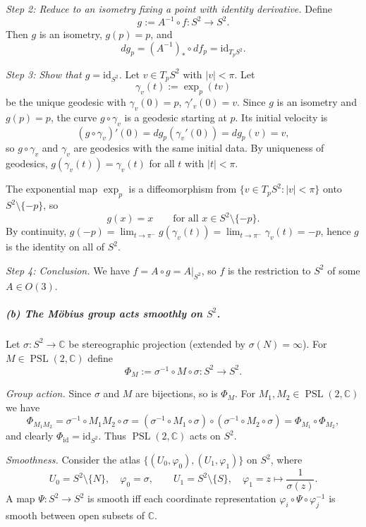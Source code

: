 \documentclass[12pt,a4paper]{article}
\theoremstyle{plain}
\theoremstyle{definition}      %
\begin{document}
	\emph{Step 2: Reduce to an isometry fixing a point with identity derivative.}
	Define
	\[
	g := A^{-1}\circ f:S^{2}\to S^{2}.
	\]
	Then $g$ is an isometry, $g(p)=p$, and
	\[
	dg_p=(A^{-1})_{*}\circ df_p=\mathrm{id}_{T_pS^{2}}.
	\]
	
	\emph{Step 3: Show that $g=\mathrm{id}_{S^{2}}$.}
	Let $v\in T_pS^{2}$ with $|v|<\pi$. Let
	\[
	\gamma_v(t):=\exp_p(tv)
	\]
	be the unique geodesic with $\gamma_v(0)=p$, $\gamma'_v(0)=v$.
	Since $g$ is an isometry and $g(p)=p$, the curve $g\circ\gamma_v$ is a geodesic starting at $p$.
	Its initial velocity is
	\[
	(g\circ\gamma_v)'(0)=dg_p(\gamma_v'(0))=dg_p(v)=v,
	\]
	so $g\circ\gamma_v$ and $\gamma_v$ are geodesics with the same initial data.
	By uniqueness of geodesics, $g(\gamma_v(t))=\gamma_v(t)$ for all $t$ with $|t|<\pi$.
	
	The exponential map $\exp_p$ is a diffeomorphism from
	$\{v\in T_pS^{2}:|v|<\pi\}$ onto $S^{2}\setminus\{-p\}$, so
	\[
	g(x)=x\qquad\text{for all }x\in S^{2}\setminus\{-p\}.
	\]
	By continuity, $g(-p)=\lim_{t\to\pi^-}g(\gamma_v(t))
	=\lim_{t\to\pi^-}\gamma_v(t)=-p$, hence $g$ is the identity on all of $S^{2}$.
	
	\emph{Step 4: Conclusion.}
	We have $f=A\circ g=A|_{S^{2}}$, so $f$ is the restriction to $S^{2}$ of some $A\in O(3)$.
	
	\subparagraph{(b) The M\"obius group acts smoothly on $S^{2}$.}
	
	Let $\sigma:S^{2}\to\hat{\mathbb{C}}$ be stereographic projection (extended by $\sigma(N)=\infty$).
	For $M\in\operatorname{PSL}(2,\mathbb{C})$ define
	\[
	\Phi_M := \sigma^{-1}\circ M\circ\sigma:S^{2}\to S^{2}.
	\]
	
	\emph{Group action.}
	Since $\sigma$ and $M$ are bijections, so is $\Phi_M$. For $M_1,M_2\in\operatorname{PSL}(2,\mathbb{C})$ we have
	\[
	\Phi_{M_1M_2}
	=\sigma^{-1}\circ M_1M_2\circ\sigma
	=(\sigma^{-1}\circ M_1\circ\sigma)\circ(\sigma^{-1}\circ M_2\circ\sigma)
	=\Phi_{M_1}\circ\Phi_{M_2},
	\]
	and clearly $\Phi_{\mathrm{id}}=\mathrm{id}_{S^{2}}$. Thus $\operatorname{PSL}(2,\mathbb{C})$ acts on $S^{2}$.
	
	\emph{Smoothness.}
	Consider the atlas $\{(U_0,\varphi_0),(U_1,\varphi_1)\}$ on $S^{2}$, where
	\[
	U_0=S^{2}\setminus\{N\},\quad \varphi_0=\sigma,\qquad
	U_1=S^{2}\setminus\{S\},\quad \varphi_1= z\mapsto \frac{1}{\sigma(z)}.
	\]
	A map $\Psi:S^{2}\to S^{2}$ is smooth iff each coordinate representation
	$\varphi_i\circ\Psi\circ\varphi_j^{-1}$ is smooth between open subsets of $\mathbb{C}$.
	
\end{document}

